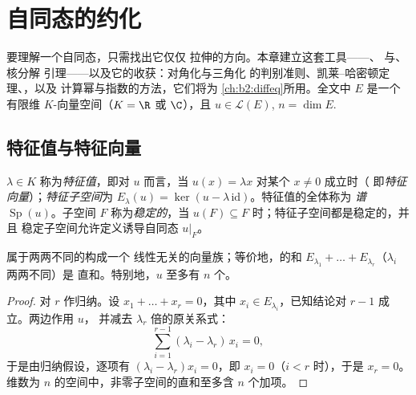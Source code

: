 \chapter{自同态的约化}\label{ch:b2:reduction}

要理解一个自同态，只需找出它仅仅
拉伸的方向。本章建立这套工具——、
与、核分解
引理——以及它的收获：对角化与三角化
的判别准则、凯莱--哈密顿定理、，以及
计算幂与指数的方法，它们将为
\cref{ch:b2:diffeq}所用。全文中 $E$ 是一个
有限维 $K$-向量空间（$K = \R$ 或 $\C$），且 $u \in
\mathcal{L}(E)$, $n = \dim E$.

\section{特征值与特征向量}

\begin{definition}\label{def:b2:reduction:eigen}
$\lambda \in K$ 称为\emph{特征值}，即对 $u$ 而言，当
$u(x) = \lambda x$ 对某个 $x \neq 0$ 成立时（
即\emph{特征向量}）；\emph{特征子空间}为 $E_\lambda(u) =
\ker(u - \lambda\,\mathrm{id})$。特征值的全体称为
\emph{谱} $\operatorname{Sp}(u)$。子空间 $F$
称为\emph{稳定的}，当 $u(F) \subseteq F$ 时；特征子空间都是稳定的，并且
稳定子空间允许定义诱导自同态 $u|_F$。
\end{definition}

\begin{theorem}[特征子空间的独立性]\label{thm:b2:reduction:independence}
属于两两不同的构成一个
线性无关的向量族；等价地，的和
$E_{\lambda_1} + \dots + E_{\lambda_r}$（$\lambda_i$ 两两不同）是
直和。特别地，$u$ 至多有 $n$ 个。
\end{theorem}

\begin{proof}
对 $r$ 作归纳。设 $x_1 + \dots + x_r = 0$，其中 $x_i \in
E_{\lambda_i}$，已知结论对 $r - 1$ 成立。两边作用 $u$，
并减去 $\lambda_r$ 倍的原关系式：
\[
\sum_{i=1}^{r-1} (\lambda_i - \lambda_r)\, x_i = 0 ,
\]
于是由归纳假设，逐项有 $(\lambda_i - \lambda_r)x_i = 0$，即 $x_i =
0$（$i < r$ 时），于是 $x_r = 0$。
维数为 $n$ 的空间中，非零子空间的直和至多含 $n$ 个加项。
\end{proof}

